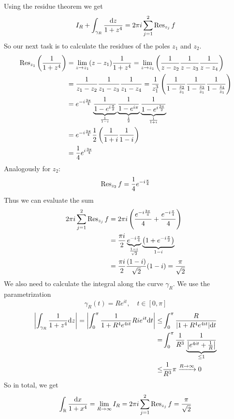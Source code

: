 \documentclass[../../script.tex]{subfiles}
\begin{document}
\begin{eg}
\begin{center}
    \end{center}
    Using the residue theorem we get 
    \[
        I_R + \int_{\gamma_R} \frac{\dd z}{1 + z^4} = 2\pi i \sum_{j=1}^2 \Res_{z_j} f
    \]
    So our next task is to calculate the residues of the poles $z_1$ and $z_2$.
    \begin{align*}
        \Res_{z_1} \left(\rec{1 + z^4}\right) &= \lim_{z \rightarrow z_1} (z - z_1)\rec{1 + z^4} = \lim_{z \rightarrow z_1} \left(\rec{z - z_2}\rec{z - z_3}\rec{z - z_4}\right) \\
        &= \rec{z_1 - z_2}\rec{z_1 - z_3}\rec{z_1 - z_4} = \rec{z_1^3} \left( \rec{1 - \frac{z_2}{z_1}} \rec{1 - \frac{z_3}{z_1}} \rec{1 - \frac{z_4}{z_1}} \right) \\
        &= e^{-i \frac{3\pi}{4}} \underbrace{\rec{1 - e^{i \frac{\pi}{2}}}}_{\rec{1 - i}} \underbrace{\rec{1 - e^{i \pi}}}_{\frac{1}{2}} \underbrace{\rec{1 - e^{i \frac{3\pi}{2}}}}_{\rec{1 + i}} \\
        &= e^{-i \frac{3\pi}{4}} \rec{2} \left(\rec{1+i}\rec{1-i}\right) \\
        &= \rec{4} e^{i \frac{3\pi}{4}}
    \end{align*}
    Analogously for $z_2$:
    \[
        \Res_{z_2} f = \frac{1}{4} e^{-i\frac{\pi}{4}}
    \]
    Thus we can evaluate the sum
    \begin{align*}
        2\pi i \sum_{j=1}^2 \Res_{z_j} f &= 2\pi i \left(\frac{e^{-i \frac{3\pi}{4}}}{4} + \frac{e^{-i\frac{\pi}{4}}}{4} \right) \\
        &= \frac{\pi i}{2} \underbrace{e^{-i \frac{\pi}{4}}}_{\frac{1 - i}{\sqrt{2}}} \underbrace{\left( 1 + e^{-i \frac{\pi}{2}}\right)}_{1 - i} \\
        &= \frac{\pi i}{2} \frac{(1 - i)}{\sqrt{2}} (1 - i) = \frac{\pi}{\sqrt{2}}
    \end{align*}
    We also need to calculate the integral along the curve $\gamma_R$. We use the parametrization 
    \[
        \gamma_R(t) = Re^{it}, \quad t \in [0, \pi]
    \]
    \begin{align*}
        \abs{\int_{\gamma_R} \rec{1 + z^4} \dd z} = \abs{\int_0^{\pi} \rec{1 + R^4 e^{4it}} R ie^{it} \dd t} \le &\int_0^{\pi} \frac{R}{\abs{1 + R^4 e^{4it}} \dd t} \\
        = &\int_0^{\pi} \frac{1}{R^3} \underbrace{\rec{\abs{e^{4it} + \rec{R}}}}_{\le 1} \\
        \le &\rec{R^3} \pi \conv{R \rightarrow \infty} 0
    \end{align*}
    So in total, we get 
    \[
        \int_{\realn} \frac{\dd x}{1 + x^4} = \lim_{R \rightarrow \infty} I_R = 2\pi i \sum_{j = 1}^2 \Res_{z_j} f = \frac{\pi}{\sqrt{2}}
    \]
\end{eg}
\end{document}
